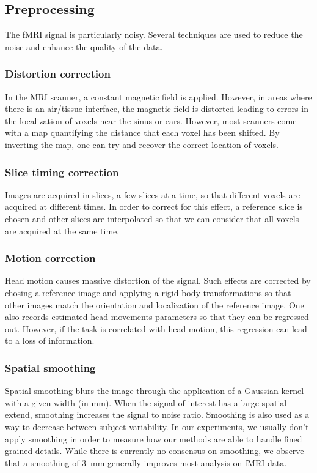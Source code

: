 \subsection{Preprocessing}
The fMRI signal is particularly noisy. Several techniques are used to reduce the noise and enhance the quality of the data.

\subsubsection{Distortion correction}
In the MRI scanner, a constant magnetic field is applied. However, in areas
where there is an air/tissue interface, the magnetic field is distorted leading to errors in
the localization of voxels near the sinus or ears. However, most scanners come
with a map quantifying the distance that each voxel has been shifted. By
inverting the map, one can try and recover the correct location of voxels.


\subsubsection{Slice timing correction}
Images are acquired in slices, a few slices at a time, so that different voxels are acquired at different times.
In order to correct for this effect, a reference slice is chosen and other
slices are interpolated so that we can consider that all voxels are acquired at the same time. 

\subsubsection{Motion correction}
Head motion causes massive distortion of the signal. Such effects are corrected by
chosing a reference image and applying a rigid body transformations so that other
images match the orientation and localization of the reference image. One also
records estimated head movements parameters so that they can be regressed out.
However, if the task is correlated with head motion, this regression can lead to
a loss of information.

\subsubsection{Spatial smoothing}
Spatial smoothing blurs the image through the application of a Gaussian kernel with a given width (in mm). When the signal of interest has a large spatial extend, smoothing increases the signal to noise ratio. 
Smoothing is also used as a way to decrease between-subject variability.
In our experiments, we usually don't apply smoothing in order to measure how our
methods are able to handle fined grained details. While there is currently no
consensus on smoothing, we observe that a smoothing of 3~mm generally improves
most analysis on fMRI data.

